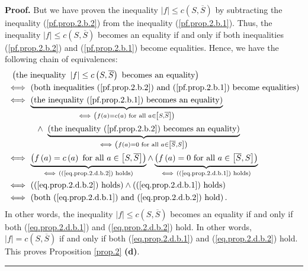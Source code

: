 \documentclass[numbers=enddot,12pt,final,onecolumn,notitlepage]{scrartcl}%
\theoremstyle{definition}
\newenvironment{proof}[1][Proof]{\noindent\textbf{#1.} }{\ \rule{0.5em}{0.5em}}
\begin{document}
\begin{proof}
But we have proven the inequality $\left\vert f\right\vert \leq c\left(
S,\overline{S}\right)  $ by subtracting the inequality (\ref{pf.prop.2.b.2})
from the inequality (\ref{pf.prop.2.b.1}). Thus, the inequality $\left\vert
f\right\vert \leq c\left(  S,\overline{S}\right)  $ becomes an equality if and
only if both inequalities (\ref{pf.prop.2.b.2}) and (\ref{pf.prop.2.b.1})
become equalities. Hence, we have the following chain of equivalences:%
\begin{align*}
&  \ \left(  \text{the inequality }\left\vert f\right\vert \leq c\left(
S,\overline{S}\right)  \text{ becomes an equality}\right) \\
&  \Longleftrightarrow\ \left(  \text{both inequalities (\ref{pf.prop.2.b.2})
and (\ref{pf.prop.2.b.1}) become equalities}\right) \\
&  \Longleftrightarrow\ \underbrace{\left(  \text{the inequality
(\ref{pf.prop.2.b.1}) becomes an equality}\right)  }_{\Longleftrightarrow
\ \left(  f\left(  a\right)  =c\left(  a\right)  \text{ for all }a\in\left[
S,\overline{S}\right]  \right)  }\\
&  \ \ \ \ \ \ \ \ \ \ \wedge\ \underbrace{\left(  \text{the inequality
(\ref{pf.prop.2.b.2}) becomes an equality}\right)  }_{\Longleftrightarrow
\ \left(  f\left(  a\right)  =0\text{ for all }a\in\left[  \overline
{S},S\right]  \right)  }\\
&  \Longleftrightarrow\ \underbrace{\left(  f\left(  a\right)  =c\left(
a\right)  \text{ for all }a\in\left[  S,\overline{S}\right]  \right)
}_{\Longleftrightarrow\ \left(  \text{(\ref{eq.prop.2.d.b.2}) holds}\right)
}\wedge\underbrace{\left(  f\left(  a\right)  =0\text{ for all }a\in\left[
\overline{S},S\right]  \right)  }_{\Longleftrightarrow\ \left(
\text{(\ref{eq.prop.2.d.b.1}) holds}\right)  }\\
&  \Longleftrightarrow\ \left(  \text{(\ref{eq.prop.2.d.b.2}) holds}\right)
\wedge\left(  \text{(\ref{eq.prop.2.d.b.1}) holds}\right) \\
&  \Longleftrightarrow\ \left(  \text{both (\ref{eq.prop.2.d.b.1}) and
(\ref{eq.prop.2.d.b.2}) hold}\right)  .
\end{align*}
In other words, the inequality $\left\vert f\right\vert \leq c\left(
S,\overline{S}\right)  $ becomes an equality if and only if both
(\ref{eq.prop.2.d.b.1}) and (\ref{eq.prop.2.d.b.2}) hold. In other words,
$\left\vert f\right\vert =c\left(  S,\overline{S}\right)  $ if and only if
both (\ref{eq.prop.2.d.b.1}) and (\ref{eq.prop.2.d.b.2}) hold. This proves
Proposition \ref{prop.2} \textbf{(d)}.
\end{proof}
\end{document}
